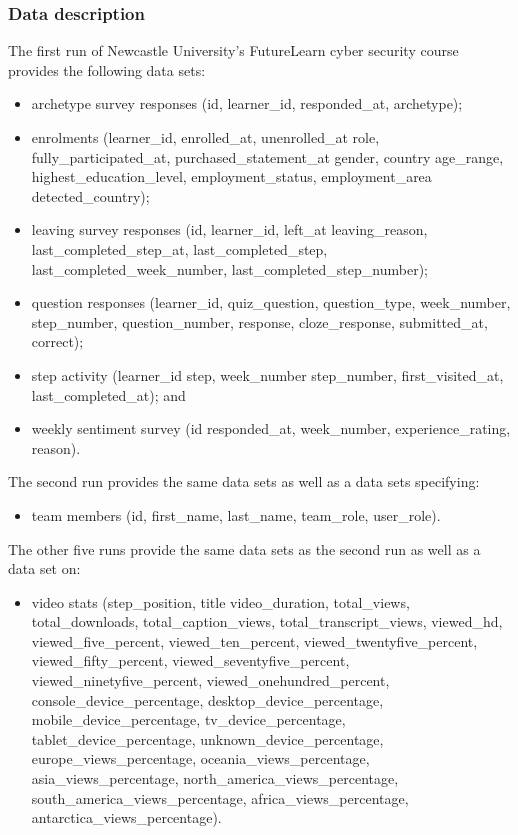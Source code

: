 \documentclass[
]{article}
\providecommand{\tightlist}{%
  \setlength{\itemsep}{0pt}\setlength{\parskip}{0pt}}
\begin{document}
\hypertarget{data-description}{%
\subsubsection{Data description}\label{data-description}}

The first run of Newcastle University's FutureLearn cyber security
course provides the following data sets:

\begin{itemize}
\item
  archetype survey responses (id, learner\_id, responded\_at,
  archetype);
\item
  enrolments (learner\_id, enrolled\_at, unenrolled\_at role,
  fully\_participated\_at, purchased\_statement\_at gender, country
  age\_range, highest\_education\_level, employment\_status,
  employment\_area detected\_country);
\item
  leaving survey responses (id, learner\_id, left\_at leaving\_reason,
  last\_completed\_step\_at, last\_completed\_step,
  last\_completed\_week\_number, last\_completed\_step\_number);
\item
  question responses (learner\_id, quiz\_question, question\_type,
  week\_number, step\_number, question\_number, response,
  cloze\_response, submitted\_at, correct);
\item
  step activity (learner\_id step, week\_number step\_number,
  first\_visited\_at, last\_completed\_at); and
\item
  weekly sentiment survey (id responded\_at, week\_number,
  experience\_rating, reason).
\end{itemize}

The second run provides the same data sets as well as a data sets
specifying:

\begin{itemize}
\tightlist
\item
  team members (id, first\_name, last\_name, team\_role, user\_role).
\end{itemize}

The other five runs provide the same data sets as the second run as well
as a data set on:

\begin{itemize}
\tightlist
\item
  video stats (step\_position, title video\_duration, total\_views,
  total\_downloads, total\_caption\_views, total\_transcript\_views,
  viewed\_hd, viewed\_five\_percent, viewed\_ten\_percent,
  viewed\_twentyfive\_percent, viewed\_fifty\_percent,
  viewed\_seventyfive\_percent, viewed\_ninetyfive\_percent,
  viewed\_onehundred\_percent, console\_device\_percentage,
  desktop\_device\_percentage, mobile\_device\_percentage,
  tv\_device\_percentage, tablet\_device\_percentage,
  unknown\_device\_percentage, europe\_views\_percentage,
  oceania\_views\_percentage, asia\_views\_percentage,
  north\_america\_views\_percentage, south\_america\_views\_percentage,
  africa\_views\_percentage, antarctica\_views\_percentage).
\end{itemize}
\end{document}
